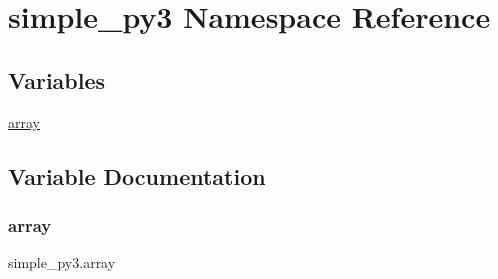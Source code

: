 \hypertarget{namespacesimple__py3}{}\section{simple\+\_\+py3 Namespace Reference}
\label{namespacesimple__py3}
\subsection*{Variables}
\begin{DoxyCompactItemize}
\item 
\hyperlink{namespacesimple__py3_a33f6c863b6fa8107c681debeda247923}{array}
\end{DoxyCompactItemize}


\subsection{Variable Documentation}
\mbox{\label{namespacesimple__py3_a33f6c863b6fa8107c681debeda247923}} 
\subsubsection{\texorpdfstring{array}{array}}
{\footnotesize\ttfamily simple\+\_\+py3.\+array}

